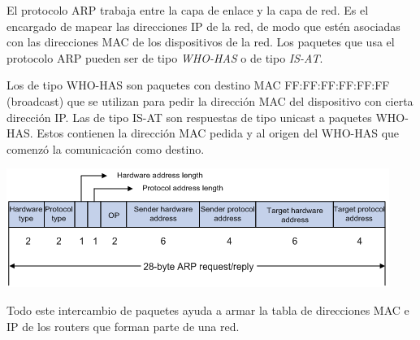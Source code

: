 El protocolo ARP trabaja entre la capa de enlace y la capa de red. 
Es el encargado de mapear las direcciones IP de la red, de modo que estén asociadas con las direcciones MAC de los dispositivos de la red.
Los paquetes que usa el protocolo ARP pueden ser de tipo \textit{WHO-HAS} o de
tipo \textit{IS-AT}.

Los de tipo WHO-HAS son paquetes con destino MAC FF:FF:FF:FF:FF:FF (broadcast)
que se utilizan para pedir la dirección MAC del dispositivo con cierta
dirección IP.
Las de tipo IS-AT son respuestas de tipo unicast a paquetes WHO-HAS.
Estos contienen la dirección MAC pedida y al origen
del WHO-HAS que comenzó la comunicación como destino.

\begin{center}
\includegraphics[scale=0.8]{arp.png}
\end{center}

Todo este intercambio de paquetes ayuda a armar la tabla de direcciones MAC e IP de los routers que forman parte de una red.
   
